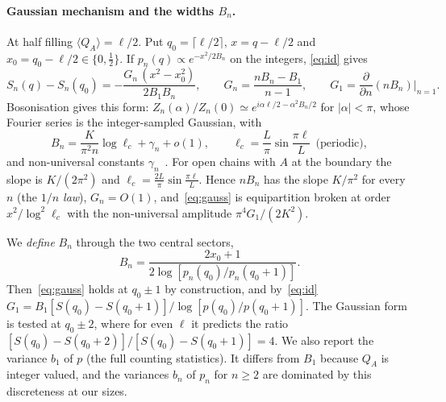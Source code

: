 \documentclass[11pt]{article}
\begin{document}
\paragraph{Gaussian mechanism and the widths $B_n$.} At half filling $\langle Q_A\rangle=\ell/2$. Put $q_0=\lceil\ell/2\rceil$,
$x=q-\ell/2$ and $x_0=q_0-\ell/2\in\{0,\frac12\}$. If $p_n(q)\propto e^{-x^2/2B_n}$ on the integers, \eqref{eq:id} gives
\begin{equation}\label{eq:gauss}
  S_n(q)-S_n(q_0)=-\frac{G_n\,(x^2-x_0^2)}{2B_1B_n},\qquad G_n=\frac{nB_n-B_1}{n-1},\qquad
  G_1=\frac{\partial}{\partial n}(nB_n)\Big|_{n=1}.
\end{equation}
Bosonisation gives this form: $Z_n(\alpha)/Z_n(0)\simeq e^{i\alpha\ell/2-\alpha^2B_n/2}$ for $|\alpha|<\pi$, whose Fourier
series is the integer-sampled Gaussian, with
\begin{equation}\label{eq:Bn}
  B_n=\frac{K}{\pi^2n}\log\ell_c+\gamma_n+o(1),\qquad \ell_c=\frac L\pi\sin\frac{\pi\ell}L\ \ \text{(periodic)},
\end{equation}
and non-universal constants $\gamma_n$~\cite{goldstein2018,estienne2021}. For open chains with $A$ at the boundary the
slope is $K/(2\pi^2)$ and $\ell_c=\frac{2L}\pi\sin\frac{\pi\ell}L$. Hence $nB_n$ has the slope $K/\pi^2$ for every $n$
(the \emph{$1/n$ law}), $G_n=O(1)$, and~\eqref{eq:gauss} is equipartition broken at order $x^2/\log^2\ell_c$ with the
non-universal amplitude $\pi^4G_1/(2K^2)$.

We \emph{define} $B_n$ through the two central sectors,
\begin{equation}\label{eq:Bdef}
  B_n=\frac{2x_0+1}{2\log[p_n(q_0)/p_n(q_0+1)]}.
\end{equation}
Then~\eqref{eq:gauss} holds at $q_0\pm1$ by construction, and by~\eqref{eq:id}
$G_1=B_1[S(q_0)-S(q_0+1)]/\log[p(q_0)/p(q_0+1)]$. The Gaussian form is tested at $q_0\pm2$, where for even $\ell$ it
predicts the ratio $[S(q_0)-S(q_0+2)]/[S(q_0)-S(q_0+1)]=4$. We also report the variance $b_1$ of $p$ (the full counting
statistics). It differs from $B_1$ because $Q_A$ is integer valued, and the variances $b_n$ of $p_n$ for $n\ge2$ are
dominated by this discreteness at our sizes.
\end{document}
